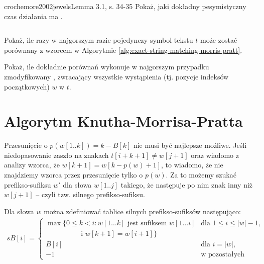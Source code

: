 \begin{problem}{crochemore2002jewels}{Lemma 3.1, s. 34-35}
  Pokaż, jaki dokładny pesymistyczny czas działania ma .
\end{problem}


\begin{code}
\inputminted{python}{code/exact-string-matching/morris-pratt.py}
\label{alg:exact-string-matching-morris-pratt}
\end{code}

\begin{problem}{}{}
  Pokaż, ile razy w najgorszym razie pojedynczy symbol tekstu $t$ może zostać porównany z wzorcem w Algorytmie \ref{alg:exact-string-matching-morris-pratt}.
\end{problem}

\begin{problem}{}{}
  Pokaż, ile dokładnie porównań wykonuje w najgorszym przypadku zmodyfikowany , zwracający wszystkie wystąpienia (tj. pozycje indeksów początkowych) $w$ w $t$.
\end{problem}

\section{Algorytm Knutha-Morrisa-Pratta}

Przesunięcie o $p(w[1..k]) = k - B[k]$ nie musi być najlepsze możliwe. Jeśli niedopasowanie zaszło na znakach $t[i + k + 1] \neq w[j + 1]$ oraz wiadomo z analizy wzorca, że $w[k + 1] = w[k - p(w) + 1]$, to wiadomo, że nie znajdziemy wzorca przez przesunięcie tylko o $p(w)$. Za to możemy szukać prefikso-sufiksu $w'$ dla słowa $w[1..j]$ takiego, że następuje po nim znak inny niż $w[j + 1]$ -- czyli tzw. silnego prefikso-sufiksu.

Dla słowa $w$ można zdefiniować tablice silnych prefikso-sufiksów następująco:
\begin{align*}
  sB[i] = 
  \begin{cases}
    \max\{0 \le k < i:\text{$w[1 \ldots k]$ jest sufiksem $w[1\ldots i]$} & \text{dla $1 \le i \le |w| - 1$,} \\
    \qquad\qquad\quad\text{i $w[k + 1] = w[i + 1]$}\} \\
    B[i] & \text{dla $i = |w|$,} \\
    -1 & \text{w pozostałych przypadkach.}
  \end{cases}
\end{align*}

